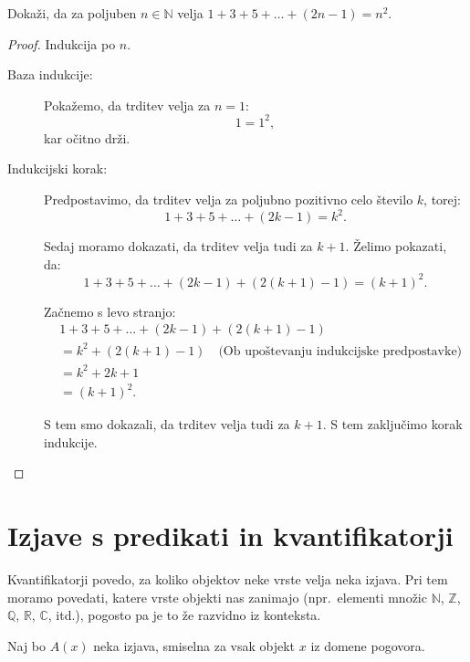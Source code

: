 \documentclass[11pt,paper=b5,footinclude,headinclude]{scrbook} %
\newcounter{example}
\begin{document}
\begin{example*}
    Dokaži, da za poljuben $n\in \mathbb N$ velja $1 + 3 + 5 + \ldots + (2n-1) = n^2$.

\begin{proof}
Indukcija po $n$.
\begin{description}
    \item[Baza indukcije:] Pokažemo, da trditev velja za $n = 1$:
\[
1 = 1^2,
\]
kar očitno drži.
\item[Indukcijski korak:]Predpostavimo, da trditev velja za poljubno pozitivno celo število $k$, torej:
\[
1 + 3 + 5 + \ldots + (2k-1) = k^2.
\]

Sedaj moramo dokazati, da trditev velja tudi za $k+1$. Želimo pokazati, da:
\[
1 + 3 + 5 + \ldots + (2k-1) + (2(k+1)-1) = (k+1)^2.
\]

Začnemo s levo stranjo:
\begin{align*}
&1 + 3 + 5 + \ldots + (2k-1) + (2(k+1)-1) \\
&= k^2 + (2(k+1) - 1) \quad \text{(Ob upoštevanju indukcijske predpostavke)} \\
&= k^2 + 2k + 1 \\
&= (k+1)^2.
\end{align*}

S tem smo dokazali, da trditev velja tudi za $k+1$. S tem zaključimo korak indukcije.

\end{description}

\end{proof}
\end{example*}

\section{Izjave s predikati in kvantifikatorji}

Kvantifikatorji povedo, za koliko objektov neke vrste velja neka izjava.
Pri tem moramo povedati, katere vrste objekti nas zanimajo (npr.~elementi množic $\mathbb{N}$, $\mathbb{Z}$, $\mathbb{Q}$, $\mathbb{R}$, $\mathbb{C}$, itd.), pogosto pa je to že razvidno iz konteksta.

Naj bo $A(x)$ neka izjava, smiselna za vsak objekt $x$ iz domene pogovora.
\iftoggle{long}{
{\color{blue}Taki izjavi pravimo \emph{ predikat}.
Predikati oblike $A(x)$ so enomestni. Poznamo pa tudi dvo- in večmestne predikate, npr.~$A(x,y)$, $P(x_1,x_2,x_3)$ ipd.}
}
{Taki izjavi pravimo \emph{ predikat}. Predikati oblike $A(x)$ so enomestni. Poznamo pa tudi dvo- in večmestne predikate, npr.~$A(x,y)$, $P(x_1,x_2,x_3)$ ipd.}
\end{document}

